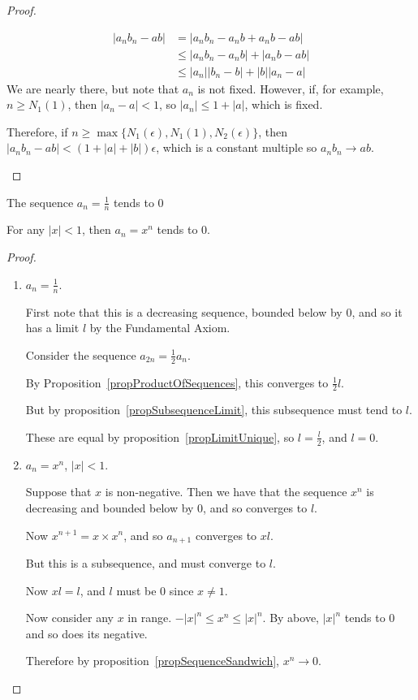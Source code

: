 \documentclass[../Main.tex]{subfiles}
\begin{document}
\begin{proof}
\begin{enumerate}
\begin{align*}
                |a_n b_n - ab| &= |a_n b_n - a_n b + a_n b - ab| \\
                &\leq |a_n b_n - a_n b| + |a_n b - ab| \\
                &\leq |a_n| |b_n - b| + |b| |a_n - a|
            \end{align*}
            We are nearly there, but note that $a_n$ is not fixed. However, if, for example, $n \geq N_1(1)$, then $|a_n - a| < 1$, so $|a_n| \leq 1 + |a|$, which is fixed.\par
            Therefore, if $n \geq \max{\{N_1(\epsilon), N_1(1), N_2(\epsilon)\}}$, then $|a_n b_n - ab| < (1 + |a| + |b|)\epsilon$, which is a constant multiple so $a_n b_n \rightarrow ab$.
    \end{enumerate}
\end{proof}
\begin{propositions}{
        \label{propSequenceLimits}
    }
    \item The sequence $a_n = \frac{1}{n}$ tends to 0 \label{propReciprocalLimit}
    \item For any $|x| < 1$, then $a_n = x^n$ tends to 0. \label{propPowersLimit}
\end{propositions}
\begin{proof}
    \begin{enumerate}
        \item $a_n = \frac{1}{n}$.\par
            First note that this is a decreasing sequence, bounded below by 0, and so it has a limit $l$ by the Fundamental Axiom.\par
            Consider the sequence $a_{2n} = \frac{1}{2} a_n$.\par
            By Proposition~\ref{propProductOfSequences}, this converges to $\frac{1}{2}l$.\par
            But by proposition~\ref{propSubsequenceLimit}, this subsequence must tend to $l$.\par
            These are equal by proposition~\ref{propLimitUnique}, so $l = \frac{l}{2}$, and $l = 0$.
        \item $a_n = x^n$, $|x| < 1$.\par
            Suppose that $x$ is non-negative. Then we have that the sequence $x^n$ is decreasing and bounded below by 0, and so converges to $l$.\par
            Now $x^{n+1} = x \times x^n$, and so $a_{n+1}$ converges to $x l$.\par
            But this is a subsequence, and must converge to $l$.\par
            Now $xl = l$, and $l$ must be 0 since $x \neq 1$.\par
            Now consider any $x$ in range. $-|x|^n \leq x^n \leq |x|^n$. By above, $|x|^n$ tends to 0 and so does its negative.\par
            Therefore by proposition~\ref{propSequenceSandwich}, $x^n \rightarrow 0$.
    \end{enumerate}
\end{proof}
\end{document}
